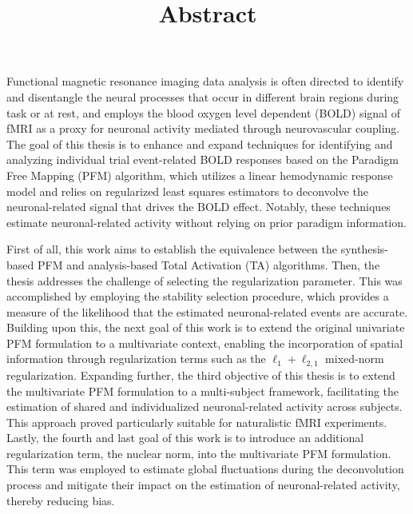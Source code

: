 \title{Abstract}

Functional magnetic resonance imaging data analysis is often directed to
identify and disentangle the neural processes that occur in different brain
regions during task or at rest, and employs the blood oxygen level dependent
(BOLD) signal of fMRI as a proxy for neuronal activity mediated through
neurovascular coupling. The goal of this thesis is to enhance and expand
techniques for identifying and analyzing individual trial event-related BOLD
responses based on the Paradigm Free Mapping (PFM) algorithm, which utilizes a linear
hemodynamic response model and relies on regularized least squares estimators to
deconvolve the neuronal-related signal that drives the BOLD effect. Notably,
these techniques estimate neuronal-related activity without relying on prior
paradigm information.

First of all, this work aims to establish the equivalence between the
synthesis-based PFM and analysis-based Total Activation (TA) algorithms. Then,
the thesis addresses the challenge of selecting the regularization parameter.
This was accomplished by employing the stability selection procedure, which
provides a measure of the likelihood that the estimated neuronal-related events
are accurate. Building upon this, the next goal of this work is to extend the
original univariate PFM formulation to a multivariate context, enabling the
incorporation of spatial information through regularization terms such as the
$\ell_1 + \ell_{2,1}$ mixed-norm regularization. Expanding further, the third
objective of this thesis is to extend the multivariate PFM formulation to a
multi-subject framework, facilitating the estimation of shared and
individualized neuronal-related activity across subjects. This approach proved
particularly suitable for naturalistic fMRI experiments. Lastly, the fourth and
last goal of this work is to introduce an additional regularization term, the
nuclear norm, into the multivariate PFM formulation. This term was employed to
estimate global fluctuations during the deconvolution process and mitigate their
impact on the estimation of neuronal-related activity, thereby reducing bias.

